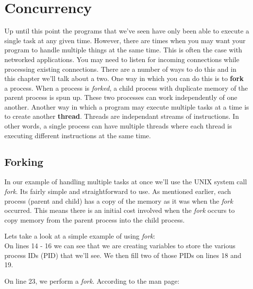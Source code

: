 \documentclass[../main.tex]{subfiles}
\begin{document}
	\chapter{Concurrency}\label{ch:7}
	Up until this point the programs that we've seen have only been able to execute a single task at any given time.  However, there are times when you may want your program to handle multiple things at the same time.  This is often the case with networked applications.  You may need to listen for incoming connections while processing existing connections.  There are a number of ways to do this and in this chapter we'll talk about a two.  
	One way in which you can do this is to \textbf{fork} a process.  When a process is \textit{forked}, a child process with duplicate memory of the parent process is spun up.  These two processes can work independently of one another.  Another way in which a program may execute multiple tasks at a time is to create another \textbf{thread}.  Threads are independant streams of instructions.  In other words, a single process can have multiple threads where each thread is executing different instructions at the same time.
	
	\section{Forking}
	In our example of handling multiple tasks at once we'll use the UNIX system call \textit{fork}.  Its fairly simple and straightforward to use.  As mentioned earlier, each process (parent and child) has a copy of the memory as it was when the \textit{fork} occurred.  This means there is an initial cost involved when the \textit{fork} occurs to copy memory from the parent process into the child process. 
	
	Lets take a look at a simple example of using \textit{fork}:\\
	
	
	
	On lines 14 - 16 we can see that we are creating variables to store the various process IDs (PID) that we'll see.  We then fill two of those PIDs on lines 18 and 19.
	
	On line 23, we perform a \textit{fork}.  According to the man page:
	
\end{document}
